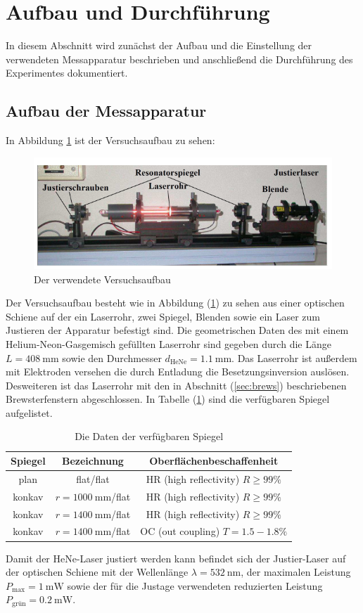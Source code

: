 \section{Aufbau und Durchführung}
\label{sec:Durchführung}
In diesem Abschnitt wird zunächst der Aufbau und die Einstellung der verwendeten Messapparatur beschrieben und anschließend die Durchführung des Experimentes dokumentiert.
\subsection{Aufbau der Messapparatur}
In Abbildung \ref{fig:aufbauhene} ist der Versuchsaufbau zu sehen:
\begin{figure}[h!]
  \centering
  \includegraphics[scale=0.55]{fig/aufbauhene.png}
  \caption{Der verwendete Versuchsaufbau \cite{Anleitung1}}
  \label{fig:aufbauhene}
\end{figure}
Der Versuchsaufbau besteht wie in Abbildung (\ref{fig:aufbauhene}) zu sehen aus einer optischen Schiene auf der ein Laserrohr, zwei Spiegel, Blenden sowie ein Laser zum Justieren der Apparatur befestigt sind. Die geometrischen Daten
des mit einem Helium-Neon-Gasgemisch gefüllten Laserrohr sind gegeben durch die Länge $L=\SI{408}{\milli\meter}$ sowie den Durchmesser $d_\mathrm{HeNe}=\SI{1.1}{\milli\meter}$. Das Laserrohr ist außerdem mit Elektroden versehen die durch Entladung die Besetzungsinversion auslösen. Desweiteren ist das Laserrohr mit den in Abschnitt (\ref{sec:brews}) beschriebenen Brewsterfenstern abgeschlossen. In Tabelle (\ref{tab:spiegel}) sind die verfügbaren Spiegel aufgelistet.
\begin{table}
  \centering
  \caption{Die Daten der verfügbaren Spiegel}
  \label{tab:spiegel}
  \begin{tabular}{c | c | c}
    \toprule
    Spiegel & Bezeichnung & Oberflächenbeschaffenheit \\
    \midrule
    plan & flat/flat & HR (high reflectivity) $R \geq 99\%$ \\
    konkav & $r=\SI{1000}{\milli\meter}$/flat & HR (high reflectivity) $R \geq 99\%$ \\
    konkav & $r=\SI{1400}{\milli\meter}$/flat & HR (high reflectivity) $R \geq 99\%$ \\
    konkav & $r=\SI{1400}{\milli\meter}$/flat & OC (out coupling) $T=1.5-1.8\%$ \\
    \bottomrule
  \end{tabular}
\end{table}
Damit der HeNe-Laser justiert werden kann befindet sich der Justier-Laser auf der optischen Schiene mit der Wellenlänge $\lambda=\SI{532}{\nano\meter}$, der maximalen Leistung $P_\mathrm{max}=\SI{1}{\milli\watt}$ sowie der für die Justage verwendeten reduzierten Leistung $P_\mathrm{grün}=\SI{0.2}{\milli\watt}$.
